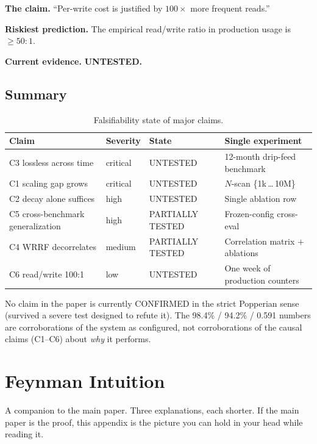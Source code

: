 \documentclass[11pt]{article}
\begin{document}
\textbf{The claim.} ``Per-write cost is justified by $100\times$
more frequent reads.''

\textbf{Riskiest prediction.}  The empirical read/write ratio in
production usage is $\ge 50:1$.

\textbf{Current evidence.} \textbf{UNTESTED.}

\subsection{Summary}
\label{app:popper-summary}

\begin{table}[h]
\centering
\caption{Falsifiability state of major claims.}
\label{tab:popper-summary}
\small
\begin{tabular}{llll}
\toprule
Claim & Severity & State & Single experiment \\
\midrule
C3 lossless across time         & critical & UNTESTED         & 12-month drip-feed benchmark \\
C1 scaling gap grows            & critical & UNTESTED         & $N$-scan \{1k\,\dots\,10M\} \\
C2 decay alone suffices         & high     & UNTESTED         & Single ablation row \\
C5 cross-benchmark generalization & high   & PARTIALLY TESTED & Frozen-config cross-eval \\
C4 WRRF decorrelates            & medium   & PARTIALLY TESTED & Correlation matrix $+$ ablations \\
C6 read/write 100:1             & low      & UNTESTED         & One week of production counters \\
\bottomrule
\end{tabular}
\end{table}

No claim in the paper is currently CONFIRMED in the strict
Popperian sense (survived a severe test designed to refute it).
The 98.4\% / 94.2\% / 0.591 numbers are corroborations of the
system as configured, not corroborations of the causal claims
(C1--C6) about \emph{why} it performs.

\section{Feynman Intuition}
\label{app:feynman}

A companion to the main paper.  Three explanations, each shorter.
If the main paper is the proof, this appendix is the picture you
can hold in your head while reading it.
\end{document}
